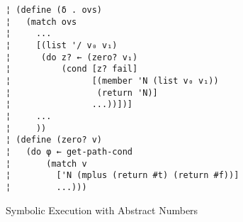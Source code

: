 \begin{figure}
\begin{lstlisting}
¦ (define (δ . ovs)
¦   (match ovs
¦     ...
¦     [(list '/ v₀ v₁)
¦      (do z? ← (zero? v₁)
¦          (cond [z? fail]
¦                [(member 'N (list v₀ v₁))
¦                 (return 'N)]
¦                ...))])]
¦     ...
¦     ))
¦ (define (zero? v)
¦   (do φ ← get-path-cond
¦       (match v
¦         ['N (mplus (return #t) (return #f))]
¦         ...)))
\end{lstlisting}
\caption{Symbolic Execution with Abstract Numbers}
\label{f:symbolic-widen}
\end{figure}

